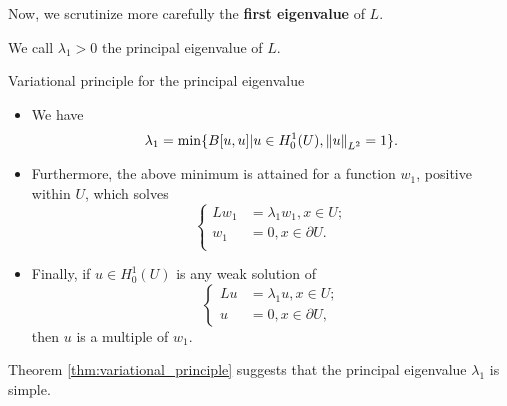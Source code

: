 Now, we scrutinize more carefully the \textbf{first eigenvalue} of $L$.
\begin{definition}
    We call $\lambda_{1}>0$ the principal eigenvalue of $L$.
\end{definition}
\begin{theorem}{Variational principle for the principal eigenvalue}
    \label{thm:variational_principle}
    \begin{itemize}
        \item We have 
        \begin{equation}
            \label{eq:principal_eig_value}
            \lambda_{1}=\min\{B[u,u]|u\in H_{0}^{1}(U),\left\|u\right\|_{L^{2}}=1\}.
        \end{equation}
        \item Furthermore, the above minimum is attained for a function $w_{1}$, positive within $U$, which solves 
        \begin{equation}
            \label{eq:eig_func_for_principal_eig}
            \left\{
                \begin{aligned}
                Lw_{1}&=\lambda_{1}w_{1},x\in U;\\
                w_{1}&=0,x\in\partial U.\\
                \end{aligned}
            \right.
        \end{equation}
        \item Finally, if $u\in H_{0}^{1}(U)$ is any weak solution of 
        \begin{equation}
            \left\{
                \begin{aligned}
                    Lu&=\lambda_{1}u,x\in U;\\
                    u&=0,x\in\partial U,
                \end{aligned}
            \right.
        \end{equation}
        then $u$ is a multiple of $w_{1}$.
    \end{itemize}
\end{theorem}
\begin{remark}
    Theorem \ref{thm:variational_principle} suggests that the principal eigenvalue $\lambda_{1}$ is simple. 
\end{remark}
